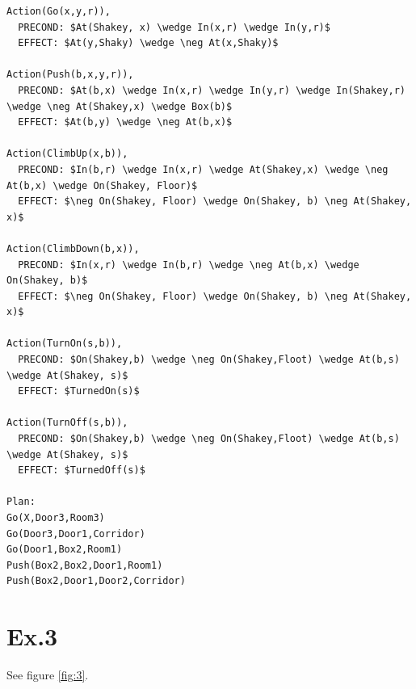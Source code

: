\documentclass[11pt]{article}
\begin{document}
\begin{lstlisting}[mathescape=true]
Action(Go(x,y,r)),
  PRECOND: $At(Shakey, x) \wedge In(x,r) \wedge In(y,r)$
  EFFECT: $At(y,Shaky) \wedge \neg At(x,Shaky)$

Action(Push(b,x,y,r)),
  PRECOND: $At(b,x) \wedge In(x,r) \wedge In(y,r) \wedge In(Shakey,r) \wedge \neg At(Shakey,x) \wedge Box(b)$
  EFFECT: $At(b,y) \wedge \neg At(b,x)$  
  
Action(ClimbUp(x,b)),
  PRECOND: $In(b,r) \wedge In(x,r) \wedge At(Shakey,x) \wedge \neg At(b,x) \wedge On(Shakey, Floor)$
  EFFECT: $\neg On(Shakey, Floor) \wedge On(Shakey, b) \neg At(Shakey, x)$  

Action(ClimbDown(b,x)),
  PRECOND: $In(x,r) \wedge In(b,r) \wedge \neg At(b,x) \wedge On(Shakey, b)$
  EFFECT: $\neg On(Shakey, Floor) \wedge On(Shakey, b) \neg At(Shakey, x)$
  
Action(TurnOn(s,b)),
  PRECOND: $On(Shakey,b) \wedge \neg On(Shakey,Floot) \wedge At(b,s) \wedge At(Shakey, s)$
  EFFECT: $TurnedOn(s)$

Action(TurnOff(s,b)),
  PRECOND: $On(Shakey,b) \wedge \neg On(Shakey,Floot) \wedge At(b,s) \wedge At(Shakey, s)$
  EFFECT: $TurnedOff(s)$

Plan:
Go(X,Door3,Room3)
Go(Door3,Door1,Corridor)
Go(Door1,Box2,Room1)
Push(Box2,Box2,Door1,Room1)
Push(Box2,Door1,Door2,Corridor)

\end{lstlisting}

\section*{Ex.3}

See figure \ref{fig:3}.
\end{document}
